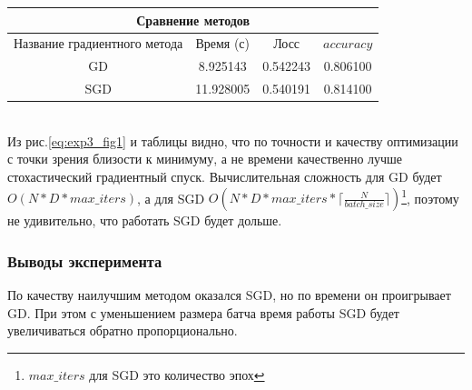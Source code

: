 \begin{tabular}{|c|c|c|c|}
	\hline
	\multicolumn{4}{|c|}{Сравнение методов}\\
	\hline
		Название  градиентного метода & Время (с)  & Лосс & $accuracy$ \\
	\hline
	  GD & 8.925143 &  0.542243 & 0.806100 \\
	\hline
	  SGD & 11.928005 & 0.540191 & 0.814100 \\
	\hline
\end{tabular}\\


Из рис.\ref{eq:exp3_fig1} и таблицы  видно, что по точности и качеству оптимизации с точки зрения близости к минимуму, а не времени качественно лучше стохастический градиентный спуск. Вычислительная сложность для GD будет $O(N*D*max\_iters)$, а для SGD $O(N*D*max\_iters* \lceil \frac{N}{batch\_size}\rceil)$\footnote{$max\_iters$ для SGD это количество эпох}, поэтому не удивительно, что работать SGD будет дольше.
\subsubsection{Выводы эксперимента}
По качеству наилучшим методом оказался SGD, но по времени он проигрывает GD. При этом с уменьшением размера батча время работы SGD будет увеличиваться обратно пропорционально.

